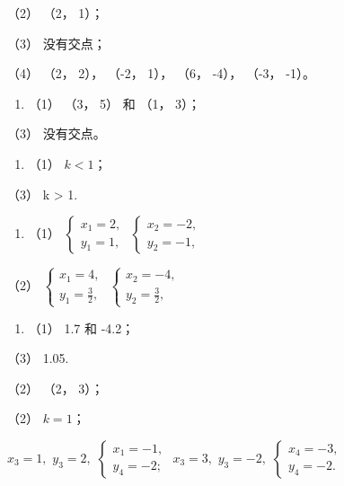 （2） （2， 1）；

（3） 没有交点；

（4） （2， 2）， （-2， 1）， （6， -4）， （-3， -1）。

\begin{enumerate}
\def\labelenumi{\arabic{enumi}.}
\setcounter{enumi}{1}
\tightlist
\item
  （1） （3， 5） 和 （1， 3）；
\end{enumerate}

（3） 没有交点。

\begin{enumerate}
\def\labelenumi{\arabic{enumi}.}
\setcounter{enumi}{2}
\tightlist
\item
  （1） \(k < 1\)；
\end{enumerate}

（3） k \textgreater{} 1.

\begin{enumerate}
\def\labelenumi{\arabic{enumi}.}
\setcounter{enumi}{3}
\tightlist
\item
  （1）
  \(\left\{ \begin{array}{l} x_{1} = 2, \\ y_{1} = 1, \end{array} \right.\)
  \(\left\{ \begin{array}{l} x_{2} = -2, \\ y_{2} = -1, \end{array} \right.\)
\end{enumerate}

（2）
\(\left\{ \begin{array}{l} x_{1} = 4, \\ y_{1} = \frac{3}{2}, \end{array} \right.\)
\(\left\{ \begin{array}{l} x_{2} = -4, \\ y_{2} = \frac{3}{2}, \end{array} \right.\)

\begin{enumerate}
\def\labelenumi{\arabic{enumi}.}
\setcounter{enumi}{4}
\tightlist
\item
  （1） 1.7 和 -4.2；
\end{enumerate}

（3） 1.05.

（2） （2， 3）；

（2） \(k = 1\)；

\(x_{3} = 1,\) \(y_{3} = 2,\)
\(\left\{ \begin{array}{l} x_{1} = -1, \\ y_{4} = -2; \end{array} \right.\)
\(x_{3} = 3,\) \(y_{3} = -2,\)
\(\left\{ \begin{array}{l} x_{4} = -3, \\ y_{4} = -2. \end{array} \right.\)


